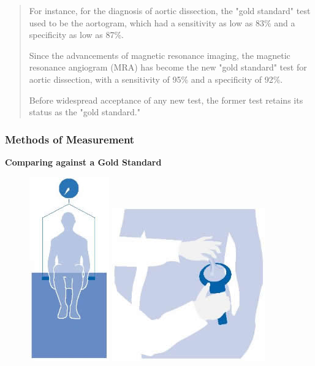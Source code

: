 \documentclass[compress]{beamer}        %
\begin{document}
\begin{frame}
\large
\begin{framed}
	\begin{quote}
For instance, for the diagnosis of aortic dissection, the "gold standard" test used to be the aortogram, which had a sensitivity as low as 83\% and a specificity as low as 87\%. 

Since the advancements of magnetic resonance imaging, the magnetic resonance angiogram (MRA) has become the new "gold standard" test for aortic dissection, with a sensitivity of 95\% and a specificity of 92\%. 

Before widespread acceptance of any new test, the former test retains its status as the "gold standard."
\end{quote}
\end{framed}

\end{frame}
\begin{frame}
	\frametitle{Methods of Measurement}
	\textbf{Comparing against a Gold Standard}
	\begin{figure}
\centering
\includegraphics[width=0.18\linewidth]{watertest}
\includegraphics[width=0.36\linewidth]{calipers}
\end{figure}

\end{frame}
\end{document}
